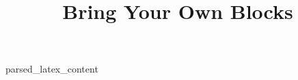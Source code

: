 \documentclass{article}
\begin{document}
\title{
    Bring Your Own Blocks
}
\date{}
\maketitle

{{ parsed_latex_content }}
\end{document}
